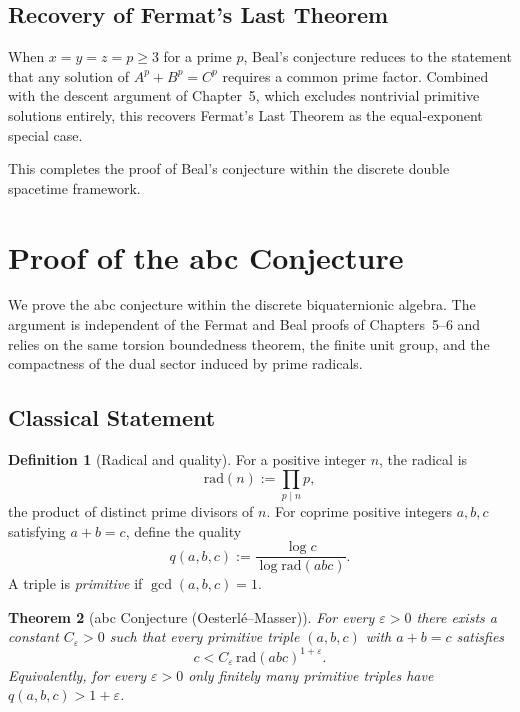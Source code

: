 \documentclass[dvipdfmx,a4paper]{article}
\newtheorem{theorem}{Theorem}[section]
\theoremstyle{definition}
\newtheorem{definition}[theorem]{Definition}
\theoremstyle{remark}
\begin{document}
\subsection{Recovery of Fermat's Last Theorem}

When \( x = y = z = p \geq 3 \) for a prime \( p \), Beal’s conjecture reduces to the statement that any solution of \( A^p + B^p = C^p \) requires a common prime factor. Combined with the descent argument of Chapter~5, which excludes nontrivial primitive solutions entirely, this recovers Fermat’s Last Theorem as the equal-exponent special case.

This completes the proof of Beal’s conjecture within the discrete double spacetime framework.

\section{Proof of the abc Conjecture}

We prove the abc conjecture within the discrete biquaternionic algebra. The argument is independent of the Fermat and Beal proofs of Chapters~5--6 and relies on the same torsion boundedness theorem, the finite unit group, and the compactness of the dual sector induced by prime radicals.

\subsection{Classical Statement}

\begin{definition}[Radical and quality]
For a positive integer \( n \), the radical is
\[
\mathrm{rad}(n) := \prod_{p \mid n} p,
\]
the product of distinct prime divisors of \( n \). For coprime positive integers \( a, b, c \) satisfying \( a + b = c \), define the quality
\[
q(a,b,c) := \frac{\log c}{\log \mathrm{rad}(abc)}.
\]
A triple is \emph{primitive} if \( \gcd(a,b,c) = 1 \).
\end{definition}

\begin{theorem}[abc Conjecture (Oesterlé--Masser)]
\label{thm:abc-classical}
For every \( \varepsilon > 0 \) there exists a constant \( C_\varepsilon > 0 \) such that every primitive triple \( (a,b,c) \) with \( a + b = c \) satisfies
\[
c < C_\varepsilon \, \mathrm{rad}(abc)^{1+\varepsilon}.
\]
Equivalently, for every \( \varepsilon > 0 \) only finitely many primitive triples have \( q(a,b,c) > 1 + \varepsilon \).
\end{theorem}
\end{document}
